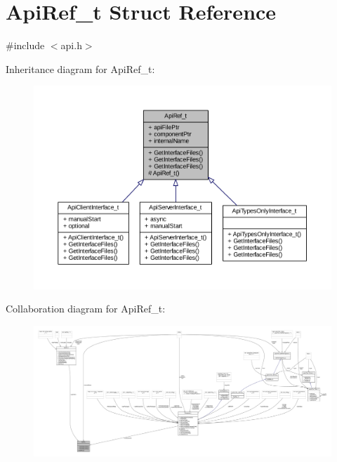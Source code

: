 \hypertarget{struct_api_ref__t}{}\section{Api\+Ref\+\_\+t Struct Reference}
\label{struct_api_ref__t}


{\ttfamily \#include $<$api.\+h$>$}



Inheritance diagram for Api\+Ref\+\_\+t\+:
\nopagebreak
\begin{figure}[H]
\begin{center}
\leavevmode
\includegraphics[width=350pt]{struct_api_ref__t__inherit__graph}
\end{center}
\end{figure}


Collaboration diagram for Api\+Ref\+\_\+t\+:
\nopagebreak
\begin{figure}[H]
\begin{center}
\leavevmode
\includegraphics[width=350pt]{struct_api_ref__t__coll__graph}
\end{center}
\end{figure}
